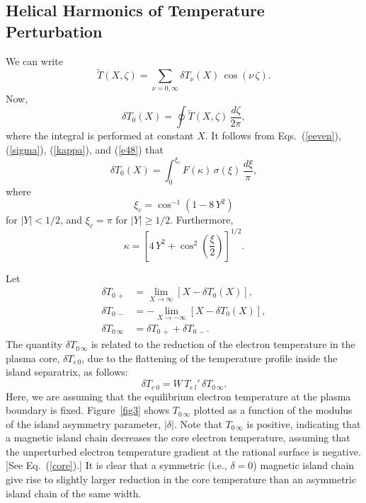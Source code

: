 \documentclass[12pt,prb,aps]{revtex4-1}
\begin{document}
\subsection{Helical Harmonics of Temperature Perturbation}
We can write
\begin{equation}
\tilde{T}(X,\zeta)=\sum_{\nu=0,\infty}\delta T_\nu(X)\,\cos(\nu\,\zeta).
\end{equation}
Now,
\begin{equation}
\delta T_0(X) = \oint \tilde{T}(X,\zeta)\,\frac{d\zeta}{2\pi},
\end{equation}
where the integral is performed at constant $X$. It follows from Eqs.~(\ref{eeven}), (\ref{sigma}),  (\ref{kappa}), and (\ref{e48}) that
\begin{equation}
\delta T_0(X) = \int_0^{\xi_c}F(\kappa)\,\sigma(\xi)\,\frac{d\xi}{\pi},
\end{equation}
where 
\begin{equation}
\xi_c = \cos^{-1}(1-8\,Y^2)
\end{equation}
for $|Y|<1/2$, and $\xi_c=\pi$ for $|Y|\geq 1/2$. Furthermore,
\begin{equation}
\kappa =\left[4\,Y^2 +\cos^2\left(\frac{\xi}{2}\right)\right]^{1/2}.
\end{equation}

Let 
\begin{align}
\delta T_{0\,+} &=\lim_{X\rightarrow \infty}\left[X - \delta T_0(X)\right],\\[0.5ex]
\delta T_{0\,-} &=-\lim_{X\rightarrow -\infty}\left[X - \delta T_0(X)\right],\\[0.5ex]
\delta T_{0\,\infty} &= \delta T_{0\,+}+ \delta T_{0\,-}.
\end{align}
The quantity $\delta T_{0\,\infty}$ is related to the reduction of the electron temperature in the plasma core, $\delta T_{e\,0}$, due to the flattening of the
temperature profile inside the island separatrix, as follows:
\begin{equation}\label{core}
\delta T_{e\,0} = W\,T_{e\,l}'\,\delta T_{0\,\infty}.
\end{equation}
Here, we are assuming that the equilibrium electron temperature at the plasma boundary is fixed.\cite{chang}
Figure~\ref{fig3} shows $T_{0\,\infty}$ plotted as a function of the modulus of the island asymmetry parameter, $|\delta|$.  
Note that $T_{0\,\infty}$ is positive, indicating that a magnetic island chain decreases the core electron temperature, assuming that the
unperturbed electron temperature gradient at the rational surface is negative. [See Eq.~(\ref{core}).] It is clear that a symmetric (i.e., $\delta=0$) magnetic
island chain give rise to slightly larger reduction in the core temperature than an asymmetric island chain of the same width. 
\end{document}
